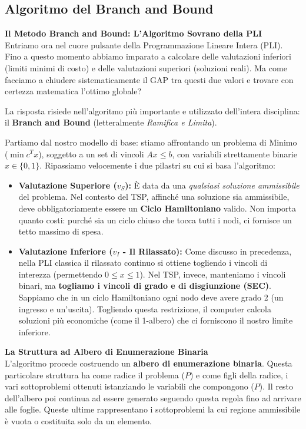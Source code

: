 \documentclass[12pt, a4paper]{article}
\begin{document}
	\subsection*{Algoritmo del Branch and Bound}
	
	\vspace{0.6cm}
	\textbf{Il Metodo Branch and Bound: L'Algoritmo Sovrano della PLI}\\
	Entriamo ora nel cuore pulsante della Programmazione Lineare Intera (PLI). Fino a questo momento abbiamo imparato a calcolare delle valutazioni inferiori (limiti minimi di costo) e delle valutazioni superiori (soluzioni reali). Ma come facciamo a chiudere sistematicamente il GAP tra questi due valori e trovare con certezza matematica l'ottimo globale? 
	
	La risposta risiede nell'algoritmo più importante e utilizzato dell'intera disciplina: il \textbf{Branch and Bound} (letteralmente \textit{Ramifica e Limita}).
	
	Partiamo dal nostro modello di base: stiamo affrontando un problema di Minimo ($\min c^T x$), soggetto a un set di vincoli $Ax \leq b$, con variabili strettamente binarie $x \in \{0, 1\}$.
	Ripassiamo velocemente i due pilastri su cui si basa l'algoritmo:
	\begin{itemize}[label=\textcolor{titlecolor}{\Large\textbullet}, itemsep=2pt, leftmargin=1.5cm]
		\item \textbf{Valutazione Superiore ($v_S$):} È data da una \textit{qualsiasi soluzione ammissibile} del problema. Nel contesto del TSP, affinché una soluzione sia ammissibile, deve obbligatoriamente essere un \textbf{Ciclo Hamiltoniano} valido. Non importa quanto costi: purché sia un ciclo chiuso che tocca tutti i nodi, ci fornisce un tetto massimo di spesa.
		\item \textbf{Valutazione Inferiore ($v_I$ - Il Rilassato):} Come discusso in precedenza, nella PLI classica il rilassato continuo si ottiene togliendo i vincoli di interezza (permettendo $0 \leq x \leq 1$). Nel TSP, invece, manteniamo i vincoli binari, ma \textbf{togliamo i vincoli di grado e di disgiunzione (SEC)}. Sappiamo che in un ciclo Hamiltoniano ogni nodo deve avere grado 2 (un ingresso e un'uscita). Togliendo questa restrizione, il computer calcola soluzioni più economiche (come il 1-albero) che ci forniscono il nostro limite inferiore.
	\end{itemize}
	
	\vspace{0.4cm}
	\textbf{La Struttura ad Albero di Enumerazione Binaria}\\
	L'algoritmo procede costruendo un \textbf{albero di enumerazione binaria}. 
	Questa particolare struttura ha come radice il problema ($P$) e come figli della radice, i vari sottoproblemi ottenuti istanziando le variabili che compongono ($P$). Il resto dell'albero poi continua ad essere generato seguendo questa regola fino ad arrivare alle foglie. Queste ultime rappresentano i sottoproblemi la cui regione ammissibile è vuota o costituita solo da un elemento.
	
\end{document}
